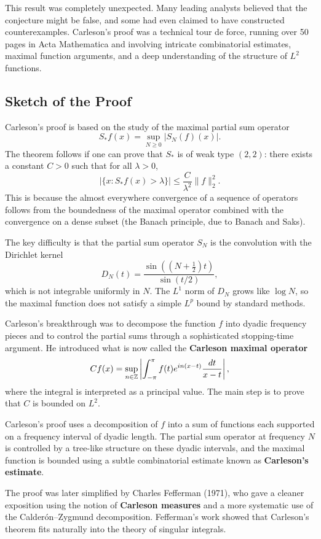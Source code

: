 This result was completely unexpected. Many leading analysts believed that the conjecture might be false, and some had even claimed to have constructed counterexamples. Carleson's proof was a technical tour de force, running over 50 pages in Acta Mathematica and involving intricate combinatorial estimates, maximal function arguments, and a deep understanding of the structure of \(L^2\) functions.

\subsection{Sketch of the Proof}

Carleson's proof is based on the study of the maximal partial sum operator
\[
S_* f(x) = \sup_{N \geq 0} |S_N(f)(x)|.
\]
The theorem follows if one can prove that \(S_*\) is of weak type \((2,2)\): there exists a constant \(C > 0\) such that for all \(\lambda > 0\),
\[
|\{x : S_* f(x) > \lambda\}| \leq \frac{C}{\lambda^2} \|f\|_2^2.
\]
This is because the almost everywhere convergence of a sequence of operators follows from the boundedness of the maximal operator combined with the convergence on a dense subset (the Banach principle, due to Banach and Saks).

The key difficulty is that the partial sum operator \(S_N\) is the convolution with the Dirichlet kernel
\[
D_N(t) = \frac{\sin((N+\frac12)t)}{\sin(t/2)},
\]
which is not integrable uniformly in \(N\). The \(L^1\) norm of \(D_N\) grows like \(\log N\), so the maximal function does not satisfy a simple \(L^p\) bound by standard methods.

Carleson's breakthrough was to decompose the function \(f\) into dyadic frequency pieces and to control the partial sums through a sophisticated stopping-time argument. He introduced what is now called the \textbf{Carleson maximal operator}
\[
C f(x) = \sup_{n \in \mathbb{Z}} \left| \int_{-\pi}^\pi f(t) e^{i n (x-t)} \frac{dt}{x-t} \right|,
\]
where the integral is interpreted as a principal value. The main step is to prove that \(C\) is bounded on \(L^2\).

Carleson's proof uses a decomposition of \(f\) into a sum of functions each supported on a frequency interval of dyadic length. The partial sum operator at frequency \(N\) is controlled by a tree-like structure on these dyadic intervals, and the maximal function is bounded using a subtle combinatorial estimate known as \textbf{Carleson's estimate}.

The proof was later simplified by Charles Fefferman (1971), who gave a cleaner exposition using the notion of \textbf{Carleson measures} and a more systematic use of the Calder\'on--Zygmund decomposition. Fefferman's work showed that Carleson's theorem fits naturally into the theory of singular integrals.

